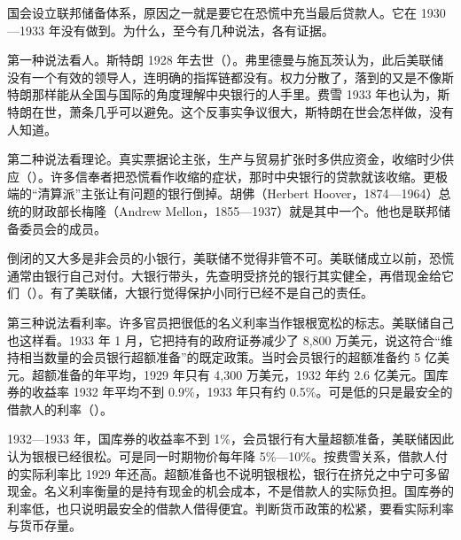 国会设立联邦储备体系，原因之一就是要它在恐慌中充当最后贷款人。它在 1930—1933 年没有做到\cite{frhgd}。为什么，至今有几种说法，各有证据。

第一种说法看人。斯特朗 1928 年去世（）。弗里德曼与施瓦茨认为，此后美联储没有一个有效的领导人，连明确的指挥链都没有。权力分散了，落到的又是不像斯特朗那样能从全国与国际的角度理解中央银行的人手里\cite{bernanke2002}。费雪 1933 年也认为，斯特朗在世，萧条几乎可以避免\cite{fisher1933}。这个反事实争议很大，斯特朗在世会怎样做，没有人知道\cite{bernanke2002}。

第二种说法看理论。真实票据论主张，生产与贸易扩张时多供应资金，收缩时少供应（）。许多信奉者把恐慌看作收缩的症状，那时中央银行的贷款就该收缩\cite{frhgd}。更极端的“清算派”主张让有问题的银行倒掉。胡佛（Herbert Hoover，1874—1964）总统的财政部长梅隆（Andrew Mellon，1855—1937）就是其中一个。他也是联邦储备委员会的成员\cite{frhgd,bnf28}。

倒闭的又大多是非会员的小银行，美联储不觉得非管不可\cite{bernanke2002}。美联储成立以前，恐慌通常由银行自己对付。大银行带头，先查明受挤兑的银行其实健全，再借现金给它们（）。有了美联储，大银行觉得保护小同行已经不是自己的责任\cite{bernanke2002}。

第三种说法看利率。许多官员把很低的名义利率当作银根宽松的标志\cite{bernanke2002}。美联储自己也这样看。1933 年 1 月，它把持有的政府证券减少了 8,800 万美元，说这符合“维持相当数量的会员银行超额准备”的既定政策\cite{frb1933}。当时会员银行的超额准备约 5 亿美元\cite{frb1933}。超额准备的年平均，1929 年只有 4,300 万美元，1932 年约 2.6 亿美元\cite{frb1937a}。国库券的收益率 1932 年平均不到 0.9\%，1933 年只有约 0.5\%\cite{frb1937a}。可是低的只是最安全的借款人的利率（）。

\begin{pitfall}
1932—1933 年，国库券的收益率不到 1\%，会员银行有大量超额准备，美联储因此认为银根已经很松。可是同一时期物价每年降 5\%—10\%。按费雪关系，借款人付的实际利率比 1929 年还高。超额准备也不说明银根松，银行在挤兑之中宁可多留现金。名义利率衡量的是持有现金的机会成本，不是借款人的实际负担。国库券的利率低，也只说明最安全的借款人借得便宜。判断货币政策的松紧，要看实际利率与货币存量。
\end{pitfall}

